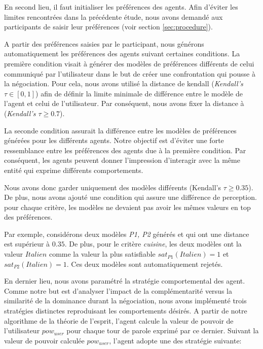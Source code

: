 	En second lieu, il faut initialiser les préférences des agents. Afin d'éviter les limites rencontrées dans la précédente étude, nous avons demandé aux participants de saisir leur préférences (voir section \ref{sec:procedure}).
	
	A partir des préférences saisies par le participant, nous générons automatiquement les préférences des agents suivant certaines conditions.
	La première condition visait à générer des modèles de préférences différents de celui communiqué par l'utilisateur dans le but de créer une confrontation qui pousse à la négociation. Pour cela, nous avons utilisé la distance de kendall \cite{bra2013Kendall}  (\emph{Kendall's  $ \tau \in [0,1]$}) afin de définir la limite minimale de différence entre le modèle de l'agent et celui de l'utilisateur. Par conséquent, nous avons fixer la distance à (\emph{Kendall's  $ \tau \geq 0.7$}).
	
	La seconde condition assurait la différence entre les modèles de préférences générées pour les différents agents. 
	Notre objectif est d'éviter une forte ressemblance entre les préférences des agents due à la première condition. Par conséquent, les agents peuvent donner l'impression d'interagir avec la même entité qui exprime différents comportements. 
	
	Nous avons donc garder uniquement des modèles différents (Kendall's  $ \tau \geq 0.35$). De plus, nous avons ajouté une condition qui assure une différence de perception. pour chaque critère, les modèles ne devaient pas avoir les mêmes valeurs en top des préférences. 
	
	Par exemple, considérons deux modèles \emph{P1, P2} générés et qui ont une distance est supérieur à $0.35$. De plus, pour le critère \textit{cuisine}, les deux modèles ont la valeur $Italien$ comme la valeur la plus satisfiable $sat_{P1}(Italien) = 1$ et $sat_{P2}(Italien) = 1$. Ces deux modèles sont automatiquement rejetés.
	
	En dernier lieu, nous avons paramétré la stratégie comportemental des agent. Comme notre but est d'analyser l'impact de la complémentarité versus la similarité de la dominance durant la négociation, nous avons implémenté trois stratégies distinctes reproduisant les comportements désirés. 
	A partir de notre algorithme de la théorie de l'esprit, l'agent calcule la valeur de pouvoir de l'utilisateur $pow_{user}$ pour chaque tour de parole exprimé par ce dernier. Suivant la valeur de pouvoir calculée $pow_{user}$, l'agent adopte une des stratégie suivante:
	
